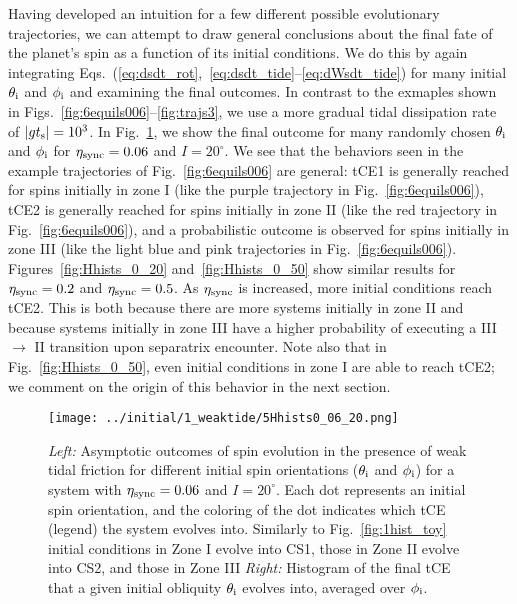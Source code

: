 \documentclass[
        fleqn,
        usenatbib,
        referee
    ]{mnras}
\newcommand*{\abs}[1]{\left|#1\right|}
\newlength{\colummwidth}
\begin{document}
Having developed an intuition for a few different possible evolutionary
trajectories, we can attempt to draw general conclusions about the final fate of
the planet's spin as a function of its initial conditions. We do this by again
integrating Eqs.~(\ref{eq:dsdt_rot},~\ref{eq:dsdt_tide}--\ref{eq:dWsdt_tide})
for many initial $\theta_{\rm i}$ and $\phi_{\rm i}$ and examining the final
outcomes. In contrast to the exmaples shown in
Figs.~\ref{fig:6equils006}--\ref{fig:trajs3}, we use a more gradual tidal
dissipation rate of $\abs{gt_{\rm s}} = 10^3$. In Fig.~\ref{fig:Hhists_0_06}, we
show the final outcome for many randomly chosen $\theta_{\rm i}$ and $\phi_{\rm
i}$ for $\eta_{\rm sync} = 0.06$ and $I = 20^\circ$. We see that the behaviors
seen in the example trajectories of Fig.~\ref{fig:6equils006} are general: tCE1
is generally reached for spins initially in zone I (like the purple trajectory
in Fig.~\ref{fig:6equils006}), tCE2 is generally reached for spins initially in
zone II (like the red trajectory in Fig.~\ref{fig:6equils006}), and a
probabilistic outcome is observed for spins initially in zone III (like the
light blue and pink trajectories in Fig.~\ref{fig:6equils006}).
Figures~\ref{fig:Hhists_0_20} and~\ref{fig:Hhists_0_50} show similar results for
$\eta_{\rm sync} = 0.2$ and $\eta_{\rm sync} = 0.5$. As $\eta_{\rm sync}$ is
increased, more initial conditions reach tCE2. This is both because there are
more systems initially in zone II and because systems initially in zone III have
a higher probability of executing a III $\to$ II transition upon separatrix
encounter. Note also that in Fig.~\ref{fig:Hhists_0_50}, even initial conditions
in zone I are able to reach tCE2; we comment on the origin of this behavior in
the next section.
\begin{figure}
    \centering
    \texttt{[image: ../initial/1\_weaktide/5Hhists0\_06\_20.png]}
    \caption{\emph{Left:} Asymptotic outcomes of spin evolution in the presence
    of weak tidal friction for different initial spin orientations ($\theta_{\rm
    i}$ and $\phi_{\rm i}$) for a system with $\eta_{\rm sync} = 0.06$ and $I =
    20^\circ$. Each dot represents an initial spin orientation, and the coloring
    of the dot indicates which tCE (legend) the system evolves into. Similarly
    to Fig.~\ref{fig:1hist_toy} initial conditions in Zone I evolve into CS1,
    those in Zone II evolve into CS2, and those in Zone III \emph{Right:}
    Histogram of the final tCE that a given initial obliquity $\theta_{\rm i}$
    evolves into, averaged over $\phi_{\rm i}$.
    }\label{fig:Hhists_0_06}
\end{figure}
\end{document}
